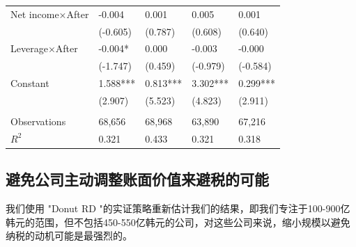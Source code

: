 \documentclass{article}
\begin{document}
\begin{table}[H]
\begin{tabular}{@{}lllll@{}}
    Net income×After   & -0.004       & 0.001    & 0.005      & 0.001         \\
                       & (-0.605)     & (0.787)  & (0.608)    & (0.640)       \\
    Leverage×After     & -0.004*      & 0.000    & -0.003     & -0.000        \\
                       & (-1.747)     & (0.459)  & (-0.979)   & (-0.584)      \\
    Constant           & 1.588***     & 0.813*** & 3.302***   & 0.299***      \\
                       & (2.907)      & (5.523)  & (4.823)    & (2.911)       \\
                       &              &          &            &               \\
    Observations       & 68,656       & 68,968   & 63,890     & 67,216        \\
    $R^2$          & 0.321        & 0.433    & 0.321      & 0.318         \\ \bottomrule
    \end{tabular}
\end{table}

\subsection{避免公司主动调整账面价值来避税的可能}
我们使用 "Donut RD "的实证策略重新估计我们的结果，即我们专注于100-900亿韩元的范围，但不包括450-550亿韩元的公司，对这些公司来说，缩小规模以避免纳税的动机可能是最强烈的。
\end{document}
